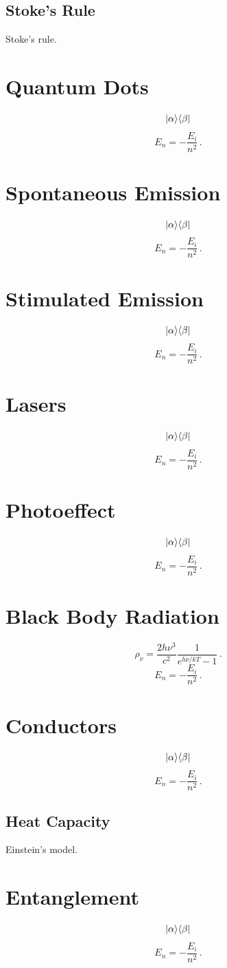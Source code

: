 \subsection{Stoke's Rule}
Stoke's rule.

\section{Quantum Dots}
\[
|{\alpha}\rangle\langle{\beta}|
\]
\[
E_n = -\frac{E_i}{n^2}\,.
\]

\section{Spontaneous Emission}
\[
|{\alpha}\rangle\langle{\beta}|
\]
\[
E_n = -\frac{E_i}{n^2}\,.
\]

\section{Stimulated Emission}
\[
|{\alpha}\rangle\langle{\beta}|
\]
\[
E_n = -\frac{E_i}{n^2}\,.
\]

\section{Lasers}
\[
|{\alpha}\rangle\langle{\beta}|
\]
\[
E_n = -\frac{E_i}{n^2}\,.
\]



\section{Photoeffect}
\[
|{\alpha}\rangle\langle{\beta}|
\]
\[
E_n = -\frac{E_i}{n^2}\,.
\]

\section{Black Body Radiation}
\[
\rho_\nu = \frac{2h\nu^3}{c^2}\frac{1}{e^{h\nu/kT}-1}\,.
\]
\[
E_n = -\frac{E_i}{n^2}\,.
\]

\section{Conductors}
\[
|{\alpha}\rangle\langle{\beta}|
\]
\[
E_n = -\frac{E_i}{n^2}\,.
\]

\subsection{Heat Capacity}
Einstein's model.

\section{Entanglement}
\[
|{\alpha}\rangle\langle{\beta}|
\]
\[
E_n = -\frac{E_i}{n^2}\,.
\]

